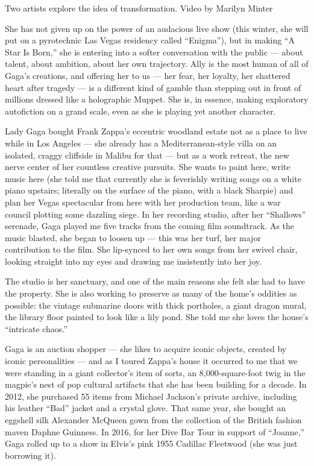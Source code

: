 Two artists explore the idea of transformation. Video by Marilyn Minter

She has not given up on the power of an audacious live show (this
winter, she will put on a pyrotechnic Las Vegas residency called
``Enigma''), but in making ``A Star Is Born,'' she is entering into a
softer conversation with the public --- about talent, about ambition,
about her own trajectory. Ally is the most human of all of Gaga's
creations, and offering her to us --- her fear, her loyalty, her
shattered heart after tragedy --- is a different kind of gamble than
stepping out in front of millions dressed like a holographic Muppet. She
is, in essence, making exploratory autofiction on a grand scale, even as
she is playing yet another character.

Lady Gaga bought Frank Zappa's eccentric woodland estate not as a place
to live while in Los Angeles --- she already has a Mediterranean-style
villa on an isolated, craggy cliffside in Malibu for that --- but as a
work retreat, the new nerve center of her countless creative pursuits.
She wants to paint here, write music here (she told me that currently
she is feverishly writing songs on a white piano upstairs; literally on
the surface of the piano, with a black Sharpie) and plan her Vegas
spectacular from here with her production team, like a war council
plotting some dazzling siege. In her recording studio, after her
``Shallows'' serenade, Gaga played me five tracks from the coming film
soundtrack. As the music blasted, she began to loosen up --- this was
her turf, her major contribution to the film. She lip-synced to her own
songs from her swivel chair, looking straight into my eyes and drawing
me insistently into her joy.

The studio is her sanctuary, and one of the main reasons she felt she
had to have the property. She is also working to preserve as many of the
home's oddities as possible: the vintage submarine doors with thick
portholes, a giant dragon mural, the library floor painted to look like
a lily pond. She told me she loves the house's ``intricate chaos.''

Gaga is an auction shopper --- she likes to acquire iconic objects,
created by iconic personalities --- and as I toured Zappa's house it
occurred to me that we were standing in a giant collector's item of
sorts, an 8,000-square-foot twig in the magpie's nest of pop cultural
artifacts that she has been building for a decade. In 2012, she
purchased 55 items from Michael Jackson's private archive, including his
leather ``Bad'' jacket and a crystal glove. That same year, she bought
an eggshell silk Alexander McQueen gown from the collection of the
British fashion maven Daphne Guinness. In 2016, for her Dive Bar Tour in
support of ``Joanne,'' Gaga rolled up to a show in Elvis's pink 1955
Cadillac Fleetwood (she was just borrowing it).

